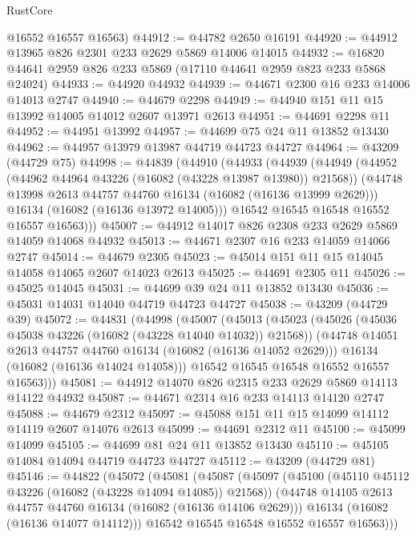 \begin{lexlean}{RustCore}
\begin{coremodule}
      @16552
      @16557
      @16563)
@44912 := @44782 @2650 @16191
@44920 := @44912 @13965 @826 @2301 @233 @2629 @5869 @14006 @14015
@44932 := @16820 @44641 @2959 @826 @233 @5869 (@17110 @44641 @2959 @823 @233 @5868 @24024)
@44933 := @44920 @44932
@44939 := @44671 @2300 @16 @233 @14006 @14013 @2747
@44940 := @44679 @2298
@44949 := @44940 @151 @11 @15 @13992 @14005 @14012 @2607 @13971 @2613
@44951 := @44691 @2298 @11
@44952 := @44951 @13992
@44957 := @44699 @75 @24 @11 @13852 @13430
@44962 := @44957 @13979 @13987 @44719 @44723 @44727
@44964 := @43209 (@44729 @75)
@44998 := @44839
    (@44910
      (@44933
        (@44939
          (@44949
            (@44952 (@44962 @44964 @43226 (@16082 (@43228 @13987 @13980)) @21568))
            (@44748 @13998 @2613 @44757 @44760 @16134 (@16082 (@16136 @13999 @2629)))
            @16134
            (@16082 (@16136 @13972 @14005)))
          @16542
          @16545
          @16548
          @16552
          @16557
          @16563)))
@45007 := @44912 @14017 @826 @2308 @233 @2629 @5869 @14059 @14068 @44932
@45013 := @44671 @2307 @16 @233 @14059 @14066 @2747
@45014 := @44679 @2305
@45023 := @45014 @151 @11 @15 @14045 @14058 @14065 @2607 @14023 @2613
@45025 := @44691 @2305 @11
@45026 := @45025 @14045
@45031 := @44699 @39 @24 @11 @13852 @13430
@45036 := @45031 @14031 @14040 @44719 @44723 @44727
@45038 := @43209 (@44729 @39)
@45072 := @44831
    (@44998
      (@45007
        (@45013
          (@45023
            (@45026 (@45036 @45038 @43226 (@16082 (@43228 @14040 @14032)) @21568))
            (@44748 @14051 @2613 @44757 @44760 @16134 (@16082 (@16136 @14052 @2629)))
            @16134
            (@16082 (@16136 @14024 @14058)))
          @16542
          @16545
          @16548
          @16552
          @16557
          @16563)))
@45081 := @44912 @14070 @826 @2315 @233 @2629 @5869 @14113 @14122 @44932
@45087 := @44671 @2314 @16 @233 @14113 @14120 @2747
@45088 := @44679 @2312
@45097 := @45088 @151 @11 @15 @14099 @14112 @14119 @2607 @14076 @2613
@45099 := @44691 @2312 @11
@45100 := @45099 @14099
@45105 := @44699 @81 @24 @11 @13852 @13430
@45110 := @45105 @14084 @14094 @44719 @44723 @44727
@45112 := @43209 (@44729 @81)
@45146 := @44822
    (@45072
      (@45081
        (@45087
          (@45097
            (@45100 (@45110 @45112 @43226 (@16082 (@43228 @14094 @14085)) @21568))
            (@44748 @14105 @2613 @44757 @44760 @16134 (@16082 (@16136 @14106 @2629)))
            @16134
            (@16082 (@16136 @14077 @14112)))
          @16542
          @16545
          @16548
          @16552
          @16557
          @16563)))

\end{coremodule}
\end{lexlean}
